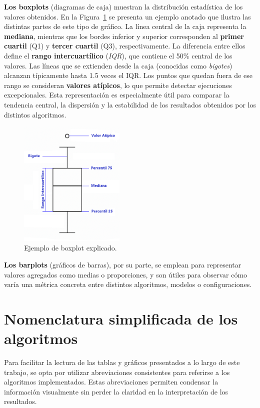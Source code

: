 \textbf{Los boxplots} (diagramas de caja) muestran la distribución estadística de los valores obtenidos.
En la Figura~\ref{fig:boxplot-explicado} se presenta un ejemplo anotado que ilustra las distintas partes de este tipo de gráfico.
La línea central de la caja representa la \textbf{mediana},
mientras que los bordes inferior y superior corresponden al \textbf{primer cuartil} (Q1) y \textbf{tercer cuartil} (Q3), respectivamente.
La diferencia entre ellos define el \textbf{rango intercuartílico} (\textit{IQR}), que contiene el 50\% central de los valores.
Las líneas que se extienden desde la caja (conocidas como \textit{bigotes}) alcanzan típicamente hasta 1.5 veces el IQR.
Los puntos que quedan fuera de ese rango se consideran \textbf{valores atípicos}, lo que permite detectar ejecuciones excepcionales.
Esta representación es especialmente útil para comparar la tendencia central, la dispersión y la estabilidad de los resultados obtenidos por los distintos algoritmos.

\begin{figure}[H]
    \centering
    \includegraphics[width=0.45\textwidth]{imagenes/boxplot-explicado}
    \caption{Ejemplo de boxplot explicado.}
    \label{fig:boxplot-explicado}
\end{figure}

\textbf{Los barplots} (gráficos de barras), por su parte, se emplean para representar valores agregados como medias o proporciones,
y son útiles para observar cómo varía una métrica concreta entre distintos algoritmos, modelos o configuraciones.


\section{Nomenclatura simplificada de los algoritmos}\label{subsec:nomenclatura-algoritmos}
Para facilitar la lectura de las tablas y gráficos presentados a lo largo de este trabajo,
se opta por utilizar abreviaciones consistentes para referirse a los algoritmos implementados.
Estas abreviaciones permiten condensar la información visualmente sin perder la claridad en la interpretación de los resultados.

